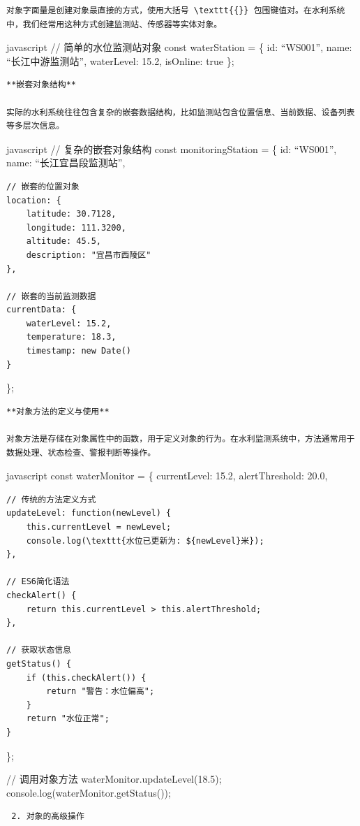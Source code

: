 {\begin{lstlisting}
对象字面量是创建对象最直接的方式，使用大括号 \texttt{{}} 包围键值对。在水利系统中，我们经常用这种方式创建监测站、传感器等实体对象。
\end{lstlisting}

javascript // 简单的水位监测站对象 const waterStation = \{ id: ``WS001'', name: ``长江中游监测站'', waterLevel: 15.2, isOnline: true \};

\begin{lstlisting}
**嵌套对象结构**

实际的水利系统往往包含复杂的嵌套数据结构，比如监测站包含位置信息、当前数据、设备列表等多层次信息。
\end{lstlisting}

javascript // 复杂的嵌套对象结构 const monitoringStation = \{ id: ``WS001'', name: ``长江宜昌段监测站'',

\begin{verbatim}
// 嵌套的位置对象
location: {
    latitude: 30.7128,
    longitude: 111.3200,
    altitude: 45.5,
    description: "宜昌市西陵区"
},

// 嵌套的当前监测数据
currentData: {
    waterLevel: 15.2,
    temperature: 18.3,
    timestamp: new Date()
}
\end{verbatim}

\};

\begin{lstlisting}
**对象方法的定义与使用**

对象方法是存储在对象属性中的函数，用于定义对象的行为。在水利监测系统中，方法通常用于数据处理、状态检查、警报判断等操作。
\end{lstlisting}

javascript const waterMonitor = \{ currentLevel: 15.2, alertThreshold: 20.0,

\begin{verbatim}
// 传统的方法定义方式
updateLevel: function(newLevel) {
    this.currentLevel = newLevel;
    console.log(\texttt{水位已更新为: ${newLevel}米});
},

// ES6简化语法
checkAlert() {
    return this.currentLevel > this.alertThreshold;
},

// 获取状态信息
getStatus() {
    if (this.checkAlert()) {
        return "警告：水位偏高";
    }
    return "水位正常";
}
\end{verbatim}

\};

// 调用对象方法 waterMonitor.updateLevel(18.5); console.log(waterMonitor.getStatus());

\begin{lstlisting}
 2. 对象的高级操作


\end{lstlisting}}
